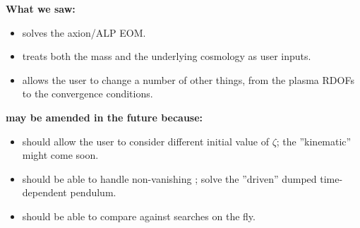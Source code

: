 \documentclass[10pt,utf8,compress,xcolor=dvipsnames]{beamer}
\begin{document}
\begin{frame}[fragile]{\insertsectionhead}
	\begin{center}
		\bf{What we saw:}
	\end{center}
	\begin{itemize}
		\item \mimes solves the axion/ALP EOM. 
		\item \mimes treats both the mass and the underlying cosmology as user inputs.
		\item \mimes allows the user to change a number of other things, from the plasma RDOFs to the convergence conditions.\\[0.5cm] 
	\end{itemize}
	
	\begin{center}
		\bf{\mimes may be amended in the future because:} 
	\end{center}
	\begin{itemize}
		\item \mimes should allow the user to consider different initial value of $\zeta$; the ''kinematic'' \mimes might come soon.
		\item \mimes should be able to handle non-vanishing \rhs; \ie solve the ''driven'' dumped time-dependent pendulum.
		\item \mimes should be able to compare against searches on the fly. 
	\end{itemize}
	
\end{frame}
\end{document}
